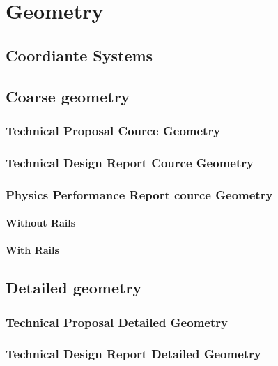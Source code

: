 \chapter{Geometry}

\section{Coordiante Systems}

\section{Coarse geometry}

\subsection{Technical Proposal Cource Geometry}

\subsection{Technical Design Report Cource Geometry}

\subsection{Physics Performance Report cource Geometry}

\subsubsection{Without Rails}

\subsubsection{With Rails}

\section{Detailed geometry}

\subsection{Technical Proposal Detailed Geometry}

\subsection{Technical Design Report Detailed Geometry}

